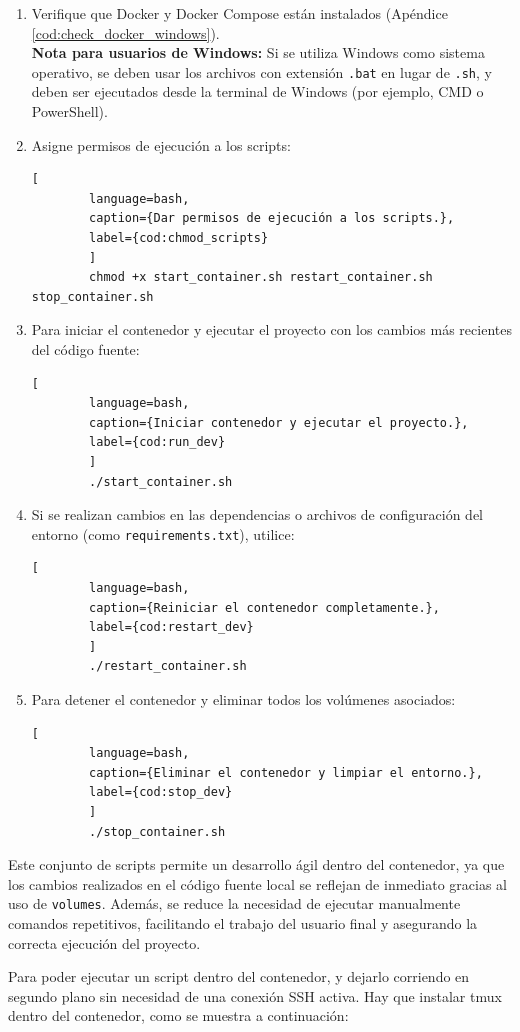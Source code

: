 \begin{enumerate}
	\item Verifique que Docker y Docker Compose están instalados (Apéndice \ref{cod:check_docker_windows}).\\
	{\footnotesize \textbf{Nota para usuarios de Windows:} Si se utiliza Windows como sistema operativo, se deben usar los archivos con extensión \texttt{.bat} en lugar de \texttt{.sh}, y deben ser ejecutados desde la terminal de Windows (por ejemplo, CMD o PowerShell).}
	
	\item Asigne permisos de ejecución a los scripts:
	\begin{lstlisting}[
		language=bash,
		caption={Dar permisos de ejecución a los scripts.},
		label={cod:chmod_scripts}
		]
		chmod +x start_container.sh restart_container.sh stop_container.sh
	\end{lstlisting}
	\item Para iniciar el contenedor y ejecutar el proyecto con los cambios más recientes del código fuente:
	\begin{lstlisting}[
		language=bash,
		caption={Iniciar contenedor y ejecutar el proyecto.},
		label={cod:run_dev}
		]
		./start_container.sh
	\end{lstlisting}
	\item Si se realizan cambios en las dependencias o archivos de configuración del entorno (como \texttt{requirements.txt}), utilice:
	\begin{lstlisting}[
		language=bash,
		caption={Reiniciar el contenedor completamente.},
		label={cod:restart_dev}
		]
		./restart_container.sh
	\end{lstlisting}
	\item Para detener el contenedor y eliminar todos los volúmenes asociados:
	\begin{lstlisting}[
		language=bash,
		caption={Eliminar el contenedor y limpiar el entorno.},
		label={cod:stop_dev}
		]
		./stop_container.sh
	\end{lstlisting}
\end{enumerate}

Este conjunto de scripts permite un desarrollo ágil dentro del contenedor, ya que los cambios realizados en el código fuente local se reflejan de inmediato gracias al uso de \texttt{volumes}. Además, se reduce la necesidad de ejecutar manualmente comandos repetitivos, facilitando el trabajo del usuario final y asegurando la correcta ejecución del proyecto.

Para poder ejecutar un script dentro del contenedor, y dejarlo corriendo en segundo plano sin necesidad de una conexión SSH activa. Hay que instalar tmux dentro del contenedor, como se muestra a continuación:

